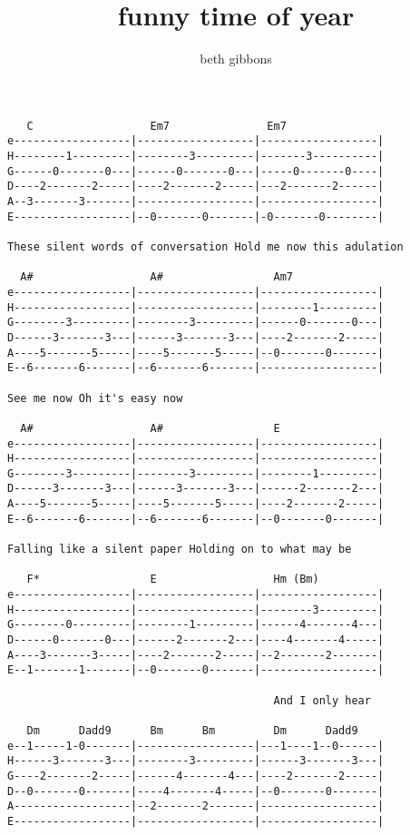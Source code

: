 \author{beth gibbons}
\title{funny time of year}
\maketitle
\begin{verbatim}
   C                  Em7               Em7
e------------------|------------------|------------------|
H--------1---------|--------3---------|-------3----------|
G------0-------0---|------0-------0---|-----0-------0----|
D----2-------2-----|----2-------2-----|---2-------2------|
A--3-------3-------|------------------|------------------|
E------------------|--0-------0-------|-0-------0--------|

These silent words of conversation Hold me now this adulation

  A#                  A#                 Am7
e------------------|------------------|------------------|
H------------------|------------------|--------1---------|
G--------3---------|--------3---------|------0-------0---|
D------3-------3---|------3-------3---|----2-------2-----|
A----5-------5-----|----5-------5-----|--0-------0-------|
E--6-------6-------|--6-------6-------|------------------|

See me now Oh it's easy now

  A#                  A#                 E
e------------------|------------------|------------------|
H------------------|------------------|------------------|
G--------3---------|--------3---------|--------1---------|
D------3-------3---|------3-------3---|------2-------2---|
A----5-------5-----|----5-------5-----|----2-------2-----|
E--6-------6-------|--6-------6-------|--0-------0-------|

Falling like a silent paper Holding on to what may be 

   F*                 E                  Hm (Bm)
e------------------|------------------|------------------|
H------------------|------------------|--------3---------|
G--------0---------|--------1---------|------4-------4---|
D------0-------0---|------2-------2---|----4-------4-----|
A----3-------3-----|----2-------2-----|--2-------2-------|
E--1-------1-------|--0-------0-------|------------------|

                                         And I only hear

   Dm      Dadd9      Bm      Bm         Dm      Dadd9
e--1-----1-0-------|------------------|---1----1--0------|
H------3-------3---|--------3---------|------3-------3---|
G----2-------2-----|------4-------4---|----2-------2-----|
D--0-------0-------|----4-------4-----|--0-------0-------|
A------------------|--2-------2-------|------------------|
E------------------|------------------|------------------|


\end{verbatim}
